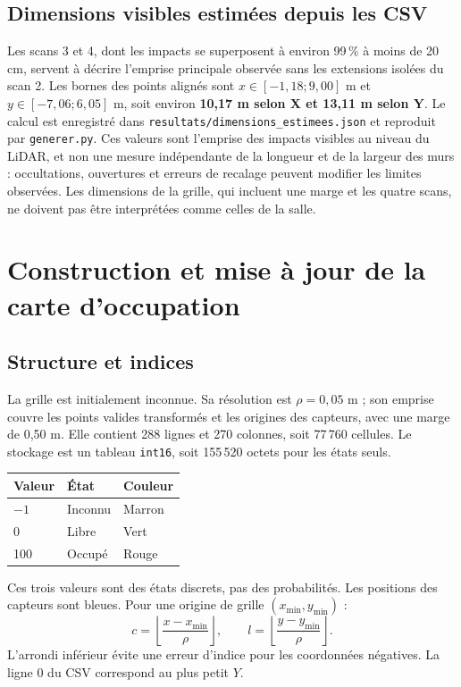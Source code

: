 \documentclass[11pt,a4paper]{article}
\begin{document}
\subsection{Dimensions visibles estimées depuis les CSV}
Les scans 3 et 4, dont les impacts se superposent à environ 99\,\% à moins de
20 cm, servent à décrire l'emprise principale observée sans les extensions
isolées du scan 2. Les bornes des points alignés sont $x\in[-1{,}18;9{,}00]$ m
et $y\in[-7{,}06;6{,}05]$ m, soit environ \textbf{10,17 m selon X et
13,11 m selon Y}. Le calcul est enregistré dans
\texttt{resultats/dimensions\_estimees.json} et reproduit par
\texttt{generer.py}. Ces valeurs sont l'emprise des impacts visibles au niveau
du LiDAR, et non une mesure indépendante de la longueur et de la largeur des
murs : occultations, ouvertures et erreurs de recalage peuvent modifier les
limites observées. Les dimensions de la grille, qui incluent une marge et les
quatre scans, ne doivent pas être interprétées comme celles de la salle.

\section{Construction et mise à jour de la carte d'occupation}
\subsection{Structure et indices}
La grille est initialement inconnue. Sa résolution est $\rho=0{,}05$ m ; son emprise couvre les points valides transformés et les origines des capteurs, avec une marge de 0,50 m. Elle contient 288 lignes et 270 colonnes, soit 77\,760 cellules. Le stockage est un tableau \texttt{int16}, soit 155\,520 octets pour les états seuls.
\begin{center}\begin{tabular}{lll}\toprule Valeur & État & Couleur \\
\midrule $-1$ & Inconnu & Marron \\ 0 & Libre & Vert \\ 100 & Occupé & Rouge \\
\bottomrule\end{tabular}\end{center}
Ces trois valeurs sont des états discrets, pas des probabilités. Les positions des capteurs sont bleues. Pour une origine de grille $(x_{\min},y_{\min})$ :
\[
 c=\left\lfloor\frac{x-x_{\min}}{\rho}\right\rfloor,\qquad
 l=\left\lfloor\frac{y-y_{\min}}{\rho}\right\rfloor.
\]
L'arrondi inférieur évite une erreur d'indice pour les coordonnées négatives. La ligne 0 du CSV correspond au plus petit $Y$.
\end{document}
